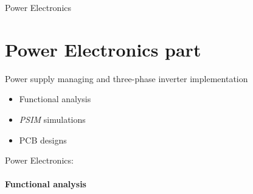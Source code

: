 \documentclass{beamer}
\begin{document}
	\author[]{Florian POUTHIER}
	\begin{frame}{Power Electronics}
		\section[ENPU]{Power Electronics part}
		Power supply managing and three-phase inverter implementation
 		\begin{itemize}
			\item Functional analysis
			\item \textit{PSIM} simulations
			\item PCB designs
		\end{itemize}
	\end{frame}
	
	\begin{frame}{Power Electronics:}
		\framesubtitle{Functional analysis}

\end{frame}
\end{document}

